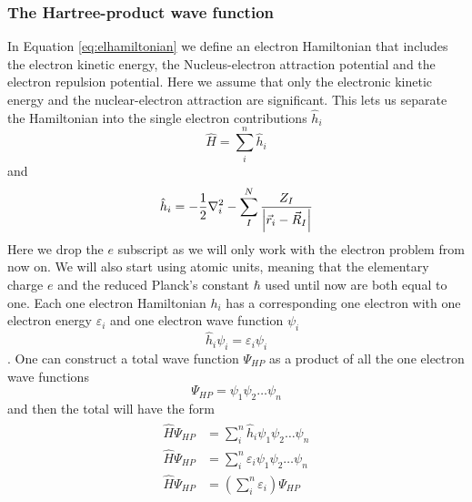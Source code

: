 \documentclass[../master_thesis.tex]{subfiles}
\begin{document}
\subsubsection{The Hartree-product wave function} %
In Equation \ref{eq:elhamiltonian} we define an electron Hamiltonian that includes
the electron kinetic energy, the Nucleus-electron attraction potential and the
electron repulsion potential. Here we assume that only the electronic kinetic energy and
the nuclear-electron attraction are significant. This lets us separate the Hamiltonian into
the single electron contributions $\hat{h}_i$
\begin{equation}
  \hat{H} = \sum^n_{i} \hat{h}_i
\end{equation}
and
\begin{equation}
  \hat{h}_i = -\frac{1}{2}\nabla^2_i - \sum^N_I \frac{Z_I}{\abs{\vec{r}_i - \vec{R}_I}}
\end{equation}
Here we drop the $e$ subscript as we will only work with the electron problem
from now on. We will also start using atomic units, meaning that the elementary charge $e$ and
the reduced Planck's constant $\hbar$ used until now are both equal to one.
Each one electron Hamiltonian $h_i$ has a corresponding one electron \SE with
one electron energy $\varepsilon_i$ and one electron wave function $\psi_i$
\begin{equation}
  \hat{h}_i\psi_i = \varepsilon_i\psi_i
\end{equation}.
One can construct a total wave function $\Psi_{HP}$ as a product of all the one electron
wave functions
\begin{equation}
  \Psi_{HP} = \psi_1\psi_2\ldots\psi_n
\end{equation}
and then the total \SE  will have the form \cite{Cramer:2004}
\begin{align}
  \begin{split}
    \hat{H}\Psi_{HP} &= \sum^n_{i} \hat{h}_i\psi_1\psi_2\ldots\psi_n\\
    \hat{H}\Psi_{HP} &= \sum_i^n\varepsilon_i\psi_1\psi_2\ldots\psi_n\\
    \hat{H}\Psi_{HP} &= \left(\sum_i^n\varepsilon_i\right)\Psi_{HP}
  \end{split}
\end{align}
\end{document}
